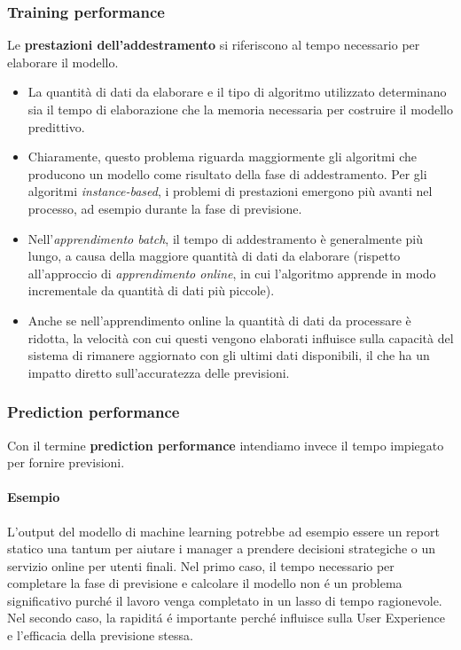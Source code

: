 \subsubsection*{Training performance}
Le \textbf{prestazioni dell'addestramento} si riferiscono al tempo necessario per elaborare il modello.
\begin{itemize}  
  \item La quantità di dati da elaborare e il tipo di algoritmo utilizzato determinano sia il tempo di elaborazione che la memoria necessaria per costruire il modello predittivo.
  
  \item Chiaramente, questo problema riguarda maggiormente gli algoritmi che producono un modello come risultato della fase di addestramento. Per gli algoritmi \textit{instance-based}, i problemi di prestazioni emergono più avanti nel processo, ad esempio durante la fase di previsione.
  
  \item Nell'\textit{apprendimento batch}, il tempo di addestramento è generalmente più lungo, a causa della maggiore quantità di dati da elaborare (rispetto all'approccio di \textit{apprendimento online}, in cui l'algoritmo apprende in modo incrementale da quantità di dati più piccole).
  
  \item Anche se nell'apprendimento online la quantità di dati da processare è ridotta, la velocità con cui questi vengono elaborati influisce sulla capacità del sistema di rimanere aggiornato con gli ultimi dati disponibili, il che ha un impatto diretto sull'accuratezza delle previsioni.
\end{itemize}

\subsubsection*{Prediction performance}
Con il termine \textbf{prediction performance} intendiamo invece il tempo impiegato per fornire previsioni. 
\paragraph{Esempio} L'output del modello di machine learning potrebbe ad esempio essere un report statico una tantum per aiutare i manager a prendere decisioni strategiche o un servizio online per utenti finali. Nel primo caso, il tempo necessario per completare la fase di previsione e calcolare il modello non é un problema significativo purché il lavoro venga completato in un lasso di tempo ragionevole. Nel secondo caso, la rapiditá é importante perché influisce sulla User Experience e l'efficacia della previsione stessa. 

